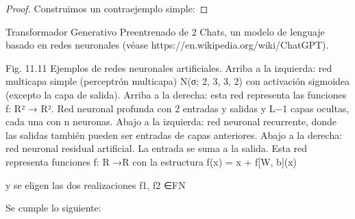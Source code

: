 



\frame{
  \maketitle
}




\begin{frame}
  \begin{proof}
    Construimos un contraejemplo simple:
  \end{proof}

  Transformador Generativo Preentrenado de 2 Chats, un modelo de lenguaje basado en redes neuronales (véase https://en.wikipedia.org/wiki/ChatGPT).

  Fig. 11.11 Ejemplos de redes neuronales artificiales. Arriba a la izquierda: red multicapa simple (perceptrón multicapa) N(σ; 2, 3, 3, 2) con activación sigmoidea (excepto la capa de salida).
  Arriba a la derecha: esta red representa las funciones f: R² → R². Red neuronal profunda con 2 entradas y salidas y L−1 capas ocultas, cada una con n neuronas. Abajo a la izquierda: red neuronal recurrente, donde las salidas también pueden ser entradas de capas anteriores. Abajo a la derecha: red neuronal residual artificial. La entrada se suma a la salida. Esta red representa funciones f: R →R con la estructura f(x) = x + f[W, b](x)

  y se eligen las dos realizaciones f1, f2 ∈FN

  Se cumple lo siguiente:
\end{frame}


